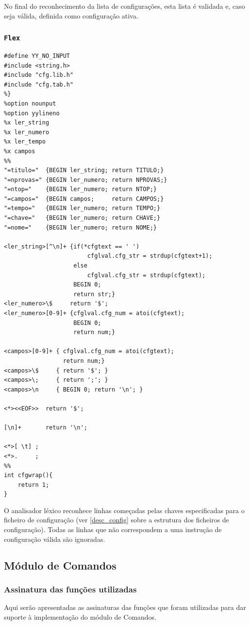\documentclass[11pt, a4paper, oneside]{article}
\begin{document}
No final do reconhecimento da lista de configurações, esta lista é validada e, caso seja válida, definida como configuração ativa.

\newpage
\subsubsection[Flex]{\texttt{Flex}}

\begin{lstlisting}[language={}, caption={Flex do módulo de configuração.}] 
%{
#define YY_NO_INPUT
#include <string.h>
#include "cfg.lib.h"
#include "cfg.tab.h"
%}
%option nounput
%option yylineno
%x ler_string
%x ler_numero
%x ler_tempo
%x campos
%%
"=titulo="  {BEGIN ler_string; return TITULO;}
"=nprovas=" {BEGIN ler_numero; return NPROVAS;}
"=ntop="    {BEGIN ler_numero; return NTOP;}
"=campos="  {BEGIN campos;     return CAMPOS;}
"=tempo="   {BEGIN ler_numero; return TEMPO;}
"=chave="   {BEGIN ler_numero; return CHAVE;}
"=nome="    {BEGIN ler_numero; return NOME;}

<ler_string>[^\n]+ {if(*cfgtext == ' ')
                        cfglval.cfg_str = strdup(cfgtext+1);
                    else
                        cfglval.cfg_str = strdup(cfgtext);
                    BEGIN 0;
                    return str;}
<ler_numero>\$     return '$';
<ler_numero>[0-9]+ {cfglval.cfg_num = atoi(cfgtext);
                    BEGIN 0;
                    return num;}

<campos>[0-9]+ { cfglval.cfg_num = atoi(cfgtext);
                 return num;}
<campos>\$     { return '$'; }
<campos>\;     { return ';'; }
<campos>\n     { BEGIN 0; return '\n'; }

<*><<EOF>>  return '$';

[\n]+       return '\n';

<*>[ \t] ;
<*>.     ;
%%
int cfgwrap(){
    return 1;
}
\end{lstlisting}

O analisador léxico reconhece linhas começadas pelas chaves especificadas para o ficheiro de configuração (ver \ref{desc_config} sobre a estrutura dos ficheiros de configuração). Todas as linhas que não correspondem a uma instrução de configuração válida são ignoradas.

\newpage
\subsection{Módulo de Comandos}

\subsubsection{Assinatura das funções utilizadas}
Aqui serão apresentadas as assinaturas das funções que foram utilizadas para dar suporte à implementação do módulo de Comandos.
\end{document}
